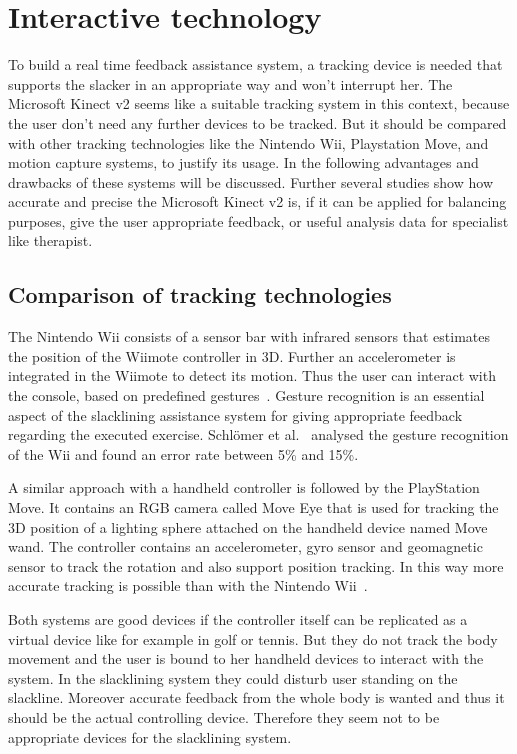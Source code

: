 \section{Interactive technology}\label{2_3_interactiveTechnology}

To build a real time feedback assistance system, a tracking device is needed that supports the slacker in an appropriate way and won't interrupt her. The Microsoft Kinect v2 seems like a suitable tracking system in this context, because the user don't need any further devices to be tracked. But it should be compared with other tracking technologies like the Nintendo Wii, Playstation Move, and motion capture systems, to justify its usage. In the following advantages and drawbacks of these systems will be discussed. Further several studies show how accurate and precise the Microsoft Kinect v2 is, if it can be applied for balancing purposes, give the user appropriate feedback, or useful analysis data for specialist like therapist.

\subsection{Comparison of tracking technologies} \label{trackingTechnologie}

The Nintendo Wii consists of a sensor bar with infrared sensors that estimates the position of the Wiimote controller in 3D. Further an accelerometer is integrated in the Wiimote to detect its motion. Thus the user can interact with the console, based on predefined gestures~\cite{Bogdanovych2015-ci, Tanaka2012-ACO}. Gesture recognition is an essential aspect of the slacklining assistance system for giving appropriate feedback regarding the executed exercise. Schlömer et al.~\cite{Schlomer2008-uo} analysed the gesture recognition of the Wii and found an error rate between 5\% and 15\%.

A similar approach with a handheld controller is followed by the PlayStation Move. It contains an RGB camera called Move Eye that is used for tracking the 3D position of a lighting sphere attached on the handheld device named Move wand. The controller contains an accelerometer, gyro sensor and geomagnetic sensor to track the rotation and also support position tracking. In this way more accurate tracking is possible than with the Nintendo Wii~\cite{Bogdanovych2015-ci, Tanaka2012-ACO}.

Both systems are good devices if the controller itself can be replicated as a virtual device like for example in golf or tennis. But they do not track the body movement and the user is bound to her handheld devices to interact with the system. In the slacklining system they could disturb user standing on the slackline. Moreover accurate feedback from the whole body is wanted and thus it should be the actual controlling device. Therefore they seem not to be appropriate devices for the slacklining system.

